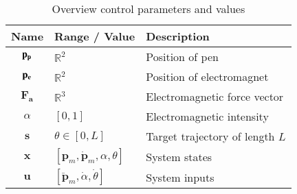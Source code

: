  
 \begin{table}[!t]  \label{tab:control_params}
  \caption{Overview control parameters and values}
  \begin{tabular}{cp{}p{}}
    \toprule
    Name & Range / Value & Description\\
    \midrule
     $\mathbf{p_p}$   			& $\mathbb{R}^2$ 						& Position of pen
     \\     
     $\mathbf{p_e}$  			& $\mathbb{R}^2$ 						& Position of electromagnet
     \\
     $\mathbf{F_a}$  			& $\mathbb{R}^3$ 						& Electromagnetic force vector
     \\
     $\alpha$ 				&$\left[0,1\right]$	 & Electromagnetic intensity
     \\
     $\mathbf{s}$  		& $\theta \in[0,L]$ 						& Target trajectory of length $L$
     \\
    $\mathbf{x}$ 		& $[\mathbf{p}_{m},\dot{\mathbf{p}}_{m}, \alpha, \theta]$ & System states 
    \\
    $\mathbf{u}$ 		& $[\ddot{\mathbf{p}}_{m}, \dot{\alpha}, \dot{\theta}] $	& System inputs 
    \\
     \bottomrule
\end{tabular}
\end{table}
